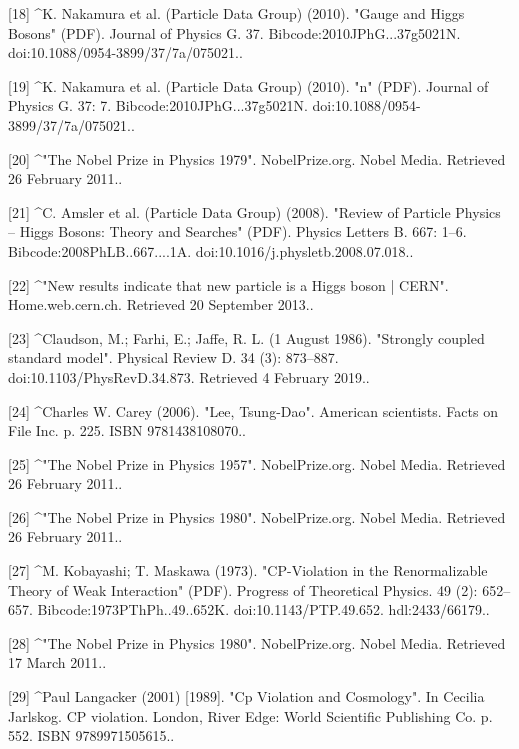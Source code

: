 [18]
^K. Nakamura et al. (Particle Data Group) (2010). "Gauge and Higgs Bosons" (PDF). Journal of Physics G. 37. Bibcode:2010JPhG...37g5021N. doi:10.1088/0954-3899/37/7a/075021..

[19]
^K. Nakamura et al. (Particle Data Group) (2010). "n" (PDF). Journal of Physics G. 37: 7. Bibcode:2010JPhG...37g5021N. doi:10.1088/0954-3899/37/7a/075021..

[20]
^"The Nobel Prize in Physics 1979". NobelPrize.org. Nobel Media. Retrieved 26 February 2011..

[21]
^C. Amsler et al. (Particle Data Group) (2008). "Review of Particle Physics – Higgs Bosons: Theory and Searches" (PDF). Physics Letters B. 667: 1–6. Bibcode:2008PhLB..667....1A. doi:10.1016/j.physletb.2008.07.018..

[22]
^"New results indicate that new particle is a Higgs boson | CERN". Home.web.cern.ch. Retrieved 20 September 2013..

[23]
^Claudson, M.; Farhi, E.; Jaffe, R. L. (1 August 1986). "Strongly coupled standard model". Physical Review D. 34 (3): 873–887. doi:10.1103/PhysRevD.34.873. Retrieved 4 February 2019..

[24]
^Charles W. Carey (2006). "Lee, Tsung-Dao". American scientists. Facts on File Inc. p. 225. ISBN 9781438108070..

[25]
^"The Nobel Prize in Physics 1957". NobelPrize.org. Nobel Media. Retrieved 26 February 2011..

[26]
^"The Nobel Prize in Physics 1980". NobelPrize.org. Nobel Media. Retrieved 26 February 2011..

[27]
^M. Kobayashi; T. Maskawa (1973). "CP-Violation in the Renormalizable Theory of Weak Interaction" (PDF). Progress of Theoretical Physics. 49 (2): 652–657. Bibcode:1973PThPh..49..652K. doi:10.1143/PTP.49.652. hdl:2433/66179..

[28]
^"The Nobel Prize in Physics 1980". NobelPrize.org. Nobel Media. Retrieved 17 March 2011..

[29]
^Paul Langacker (2001) [1989]. "Cp Violation and Cosmology". In Cecilia Jarlskog. CP violation. London, River Edge: World Scientific Publishing Co. p. 552. ISBN 9789971505615..
